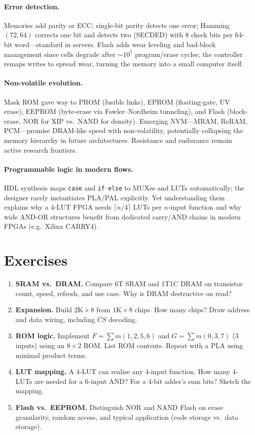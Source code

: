 
\paragraph{Error detection.} Memories add parity or ECC: single-bit parity detects one error; Hamming $(72,64)$
corrects one bit and detects two (SECDED) with 8 check bits per 64-bit word---standard in servers. Flash adds wear
leveling and bad-block management since cells degrade after $\sim10^5$ program/erase cycles; the controller remaps
writes to spread wear, turning the memory into a small computer itself.

\paragraph{Non-volatile evolution.} Mask ROM gave way to PROM (fusible links), EPROM (floating-gate, UV erase), EEPROM
(byte-erase via Fowler--Nordheim tunneling), and Flash (block-erase, NOR for XIP vs.\ NAND for density). Emerging NVM---MRAM,
ReRAM, PCM---promise DRAM-like speed with non-volatility, potentially collapsing the memory hierarchy in future architectures.
Resistance and endurance remain active research frontiers.

\paragraph{Programmable logic in modern flows.} HDL synthesis maps \texttt{case} and \texttt{if}--\texttt{else} to MUXes and LUTs automatically;
the designer rarely instantiates PLA/PAL explicitly. Yet understanding them explains why a 4-LUT FPGA needs $\lceil n/4\rceil$ LUTs
per $n$-input function and why wide AND-OR structures benefit from dedicated carry/AND chains in modern FPGAs (e.g.\ Xilinx CARRY4).

\section{Exercises}
\label{sec:ch08-exercises}
\begin{enumerate}[label=E8.\arabic*, leftmargin=*, itemsep=0.8em]
    \item \textbf{SRAM vs.\ DRAM.} Compare 6T SRAM and 1T1C DRAM on transistor count, speed, refresh, and use case. Why is DRAM destructive on read?
    \item \textbf{Expansion.} Build $2\text{K}\times8$ from $1\text{K}\times8$ chips. How many chips? Draw address and data wiring, including $\overline{CS}$ decoding.
    \item \textbf{ROM logic.} Implement $F=\sum m(1,2,5,6)$ and $G=\sum m(0,3,7)$ (3 inputs) using an $8\times2$ ROM. List ROM contents. Repeat with a PLA using minimal product terms.
    \item \textbf{LUT mapping.} A 4-LUT can realise any 4-input function. How many 4-LUTs are needed for a 6-input AND? For a 4-bit adder's sum bits? Sketch the mapping.
    \item \textbf{Flash vs.\ EEPROM.} Distinguish NOR and NAND Flash on erase granularity, random access, and typical application (code storage vs.\ data storage).
\end{enumerate}
